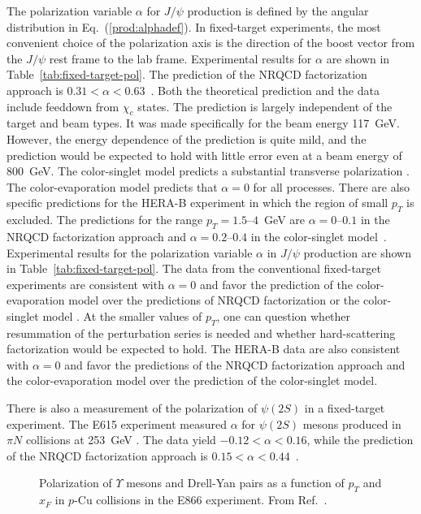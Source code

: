 The polarization variable $\alpha$ for $J/\psi$ production is
defined  by the angular distribution in Eq.~(\ref{prod:alphadef}).  
In fixed-target experiments,
the most convenient choice of the polarization axis is the direction 
of the boost vector from the $J/\psi$ rest frame to the lab frame. 
Experimental results for $\alpha$  
are shown in Table~\ref{tab:fixed-target-pol}.
The prediction of the NRQCD factorization approach is
$0.31<\alpha<0.63$~\cite{Beneke:1996tk}. Both the theoretical prediction
and the data include feeddown from $\chi_c$ states. The prediction is
largely independent of the target and beam types. It was made
specifically for the beam energy 117~GeV. However, the energy dependence
of the prediction is quite mild, and the prediction would be expected to
hold with little error even at a beam energy of 800~GeV. The
color-singlet model predicts a substantial transverse polarization
\cite{Vanttinen:1994sd}. The color-evaporation model predicts that
$\alpha = 0$ for all processes. There are also specific predictions for
the HERA-B experiment in which the region of small $p_T$ is excluded.
The predictions for the range $p_T=1.5$--$4$~GeV are $\alpha=0$--$0.1$
in the NRQCD factorization approach and $\alpha=0.2$--$0.4$ in the
color-singlet model~\cite{lee-2000}. Experimental results for the
polarization variable $\alpha$ in $J/\psi$ production are shown in
Table~\ref{tab:fixed-target-pol}. The data from the conventional
fixed-target experiments are consistent with $\alpha=0$ and favor the
prediction of the color-evaporation model over the predictions of NRQCD
factorization or the color-singlet model \cite{Beneke:1996tk}.  At the
smaller values of $p_T$, one can question whether resummation of the
perturbation series is needed and whether hard-scattering factorization
would be expected to hold. The HERA-B data are also consistent with
$\alpha=0$  and favor the predictions of the NRQCD factorization
approach and the color-evaporation model over the prediction of the
color-singlet model.

There is also a measurement of the polarization of $\psi(2S)$ in a
fixed-target experiment. The E615 experiment measured $\alpha$ for
$\psi(2S)$ mesons produced in $\pi N$ collisions at 253~GeV
\cite{Heinrich:zm}. The data yield $-0.12<\alpha<0.16$, while the
prediction of the NRQCD factorization approach is
$0.15<\alpha<0.44$~\cite{Beneke:1996tk}.

\begin{figure}[htb]
\begin{center}
\caption{Polarization of $\Upsilon$ mesons and Drell-Yan pairs as a function
of $p_T$ and $x_F$ in $p$-Cu collisions in the E866 experiment. From
Ref.~\cite{Brown:2000bz}.}
\label{fig:e866-upsilon-pol}
\end{center}
\end{figure}

